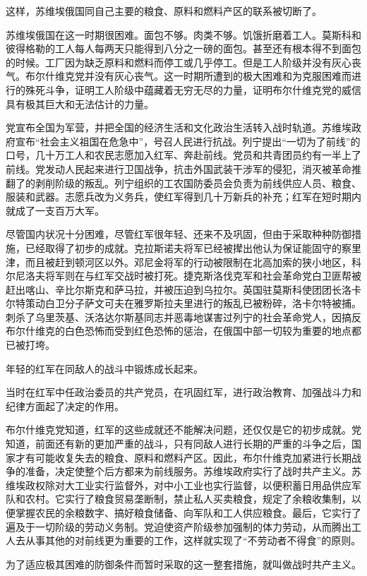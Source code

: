 这样，苏维埃俄国同自己主要的粮食、原料和燃料产区的联系被切断了。

苏维埃俄国在这一时期很困难。面包不够。肉类不够。饥饿折磨着工人。莫斯科和彼得格勒的工人每人每两天只能得到八分之一磅的面包。甚至还有根本得不到面包的时候。工厂因为缺乏原料和燃料而停工或几乎停工。但是工人阶级并没有灰心丧气。布尔什维克党并没有灰心丧气。这一时期所遭到的极大困难和为克服困难而进行的殊死斗争，证明工人阶级中蕴藏着无穷无尽的力量，证明布尔什维克党的威信具有极其巨大和无法估计的力量。

党宣布全国为军营，并把全国的经济生活和文化政治生活转入战时轨道。苏维埃政府宣布“社会主义祖国在危急中”，号召人民进行抗战。列宁提出“一切为了前线”的口号，几十万工人和农民志愿加入红军、奔赴前线。党员和共青团员约有一半上了前线。党发动人民起来进行卫国战争，抗击外国武装干涉军的侵犯，消灭被革命推翻了的剥削阶级的叛乱。列宁组织的工农国防委员会负责为前线供应人员、粮食、服装和武器。志愿兵改为义务兵，使红军得到几十万新兵的补充；红军在短时期内就成了一支百万大军。

尽管国内状况十分困难，尽管红军很年轻、还来不及巩固，但由于采取种种防御措施，已经取得了初步的成就。克拉斯诺夫将军已经被撵出他认为保证能固守的察里津，而且被赶到顿河区以外。邓尼金将军的行动被限制在北高加索的狭小地区，科尔尼洛夫将军则在与红军交战时被打死。捷克斯洛伐克军和社会革命党白卫匪帮被赶出喀山、辛比尔斯克和萨马拉，并被压迫到乌拉尔。英国驻莫斯科使团团长洛卡尔特策动白卫分子萨文可夫在雅罗斯拉夫里进行的叛乱已被粉碎，洛卡尔特被捕。刺杀了乌里茨基、沃洛达尔斯基同志并恶毒地谋害过列宁的社会革命党人，因搞反布尔什维克的白色恐怖而受到红色恐怖的惩治，在俄国中部一切较为重要的地点都已被打垮。

年轻的红军在同敌人的战斗中锻炼成长起来。

当时在红军中任政治委员的共产党员，在巩固红军，进行政治教育、加强战斗力和纪律方面起了决定的作用。

布尔什维克党知道，红军的这些成就还不能解决问题，还仅仅是它的初步成就。党知道，前面还有新的更加严重的战斗，只有同敌人进行长期的严重的斗争之后，国家才有可能收复失去的粮食、原料和燃料产区。因此，布尔什维克加紧进行长期战争的准备，决定使整个后方都来为前线服务。苏维埃政府实行了战时共产主义。苏维埃政权除对大工业实行监督外，对中小工业也实行监督，以便积蓄日用品供应军队和农村。它实行了粮食贸易垄断制，禁止私人买卖粮食，规定了余粮收集制，以便掌握农民的余粮数字、搞好粮食储备、向军队和工人供应粮食。最后，它实行了遍及于一切阶级的劳动义务制。党迫使资产阶级参加强制的体力劳动，从而腾出工人去从事其他的对前线更为重要的工作，这样就实现了“不劳动者不得食”的原则。

为了适应极其困难的防御条件而暂时采取的这一整套措施，就叫做战时共产主义。

